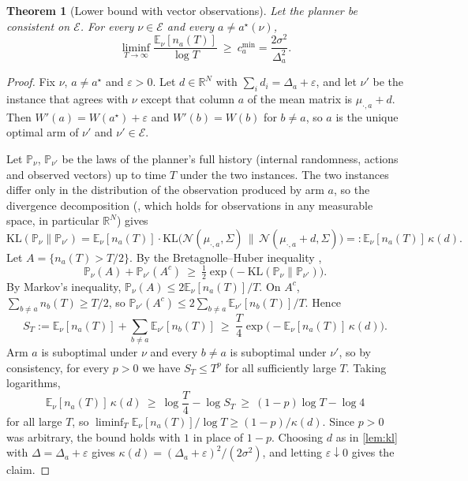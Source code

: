 \documentclass[11pt,a4paper]{article}
\theoremstyle{plain}
\newtheorem{theorem}{Theorem}
\theoremstyle{definition}
\theoremstyle{remark}
\newcommand{\E}{\mathbb{E}}
\newcommand{\Prob}{\mathbb{P}}
\newcommand{\R}{\mathbb{R}}
\newcommand{\KL}{\mathrm{KL}}
\newcommand{\cmin}{c^{\min}}
\newcommand{\astar}{a^\star}
\newcommand{\Env}{\mathcal{E}}
\begin{document}
\begin{theorem}[Lower bound with vector observations]\label{thm:lower}
Let the planner be consistent on $\Env$. For every $\nu\in\Env$ and every $a\neq\astar(\nu)$,
\[
  \liminf_{T\to\infty}\frac{\E_\nu[n_a(T)]}{\log T}\ \ge\ \cmin_a=\frac{2\sigma^2}{\Delta_a^2}.
\]
\end{theorem}

\begin{proof}
Fix $\nu$, $a\neq\astar$ and $\varepsilon>0$. Let $d\in\R^N$ with $\sum_id_i=\Delta_a+\varepsilon$, and let $\nu'$ be the instance that agrees with $\nu$ except that column $a$ of the mean matrix is $\mu_{\cdot,a}+d$. Then $W'(a)=W(\astar)+\varepsilon$ and $W'(b)=W(b)$ for $b\neq a$, so $a$ is the unique optimal arm of $\nu'$ and $\nu'\in\Env$.

Let $\Prob_\nu$, $\Prob_{\nu'}$ be the laws of the planner's full history (internal randomness, actions and observed vectors) up to time $T$ under the two instances. The two instances differ only in the distribution of the observation produced by arm $a$, so the divergence decomposition (\citealp[Lemma~15.1]{lattimore2020}, which holds for observations in any measurable space, in particular $\R^N$) gives
\[
  \KL(\Prob_\nu\|\Prob_{\nu'})=\E_\nu[n_a(T)]\cdot\KL\big(\mathcal N(\mu_{\cdot,a},\Sigma)\,\|\,\mathcal N(\mu_{\cdot,a}+d,\Sigma)\big)=:\E_\nu[n_a(T)]\,\kappa(d).
\]
Let $A=\{n_a(T)>T/2\}$. By the Bretagnolle--Huber inequality \citep[Theorem~14.2]{lattimore2020},
\[
  \Prob_\nu(A)+\Prob_{\nu'}(A^c)\ \ge\ \tfrac12\exp\big(-\KL(\Prob_\nu\|\Prob_{\nu'})\big).
\]
By Markov's inequality, $\Prob_\nu(A)\le 2\E_\nu[n_a(T)]/T$. On $A^c$, $\sum_{b\neq a}n_b(T)\ge T/2$, so $\Prob_{\nu'}(A^c)\le 2\sum_{b\neq a}\E_{\nu'}[n_b(T)]/T$. Hence
\[
  S_T:=\E_\nu[n_a(T)]+\sum_{b\neq a}\E_{\nu'}[n_b(T)]\ \ge\ \frac T4\exp\big(-\E_\nu[n_a(T)]\,\kappa(d)\big).
\]
Arm $a$ is suboptimal under $\nu$ and every $b\neq a$ is suboptimal under $\nu'$, so by consistency, for every $p>0$ we have $S_T\le T^p$ for all sufficiently large $T$. Taking logarithms,
\[
  \E_\nu[n_a(T)]\,\kappa(d)\ \ge\ \log\frac T4-\log S_T\ \ge\ (1-p)\log T-\log 4
\]
for all large $T$, so $\liminf_T\E_\nu[n_a(T)]/\log T\ge(1-p)/\kappa(d)$. Since $p>0$ was arbitrary, the bound holds with $1$ in place of $1-p$. Choosing $d$ as in \cref{lem:kl} with $\Delta=\Delta_a+\varepsilon$ gives $\kappa(d)=(\Delta_a+\varepsilon)^2/(2\sigma^2)$, and letting $\varepsilon\downarrow0$ gives the claim.
\end{proof}
\end{document}
